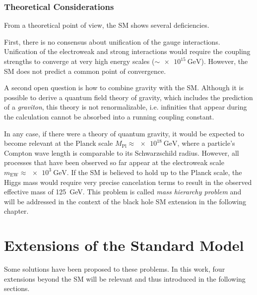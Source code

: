 \subsubsection{Theoretical Considerations}
From a theoretical point of view, the \ac{SM} shows several deficiencies. 

First, there is no consensus about unification of the gauge interactions. Unification of the electroweak and strong interactions would require the coupling strengths to converge at very high energy scales ($\sim \SI{e15}{\GeV}$). However, the \acl{SM} does not predict a common point of convergence\cite{Amaldi:Comparisongrandunified}. 

A second open question is how to combine gravity with the \acl{SM}. Although it is possible to derive a quantum field theory of gravity, which includes the prediction of a \emph{graviton}, this theory is not renormalizable, i.e. infinities that appear during the calculation cannot be absorbed into a running coupling constant\cite{Donoghue:IntroductionEffectiveField}.

In any case, if there were a theory of quantum gravity, it would be expected to become relevant at the Planck scale $M_\text{Pl} \approx \SI{e18}{\GeV}$, where a particle's Compton wave length is comparable to its Schwarzschild radius. However, all processes that have been observed so far appear at the electroweak scale $m_\text{EW} \approx \SI{e3}{\GeV}$. If the \acl{SM} is believed to hold up to the Planck scale, the Higgs mass would require very precise cancelation terms to result in the observed effective mass of \SI{125}{\GeV}. This problem is called \emph{mass hierarchy problem}\cite{Amaldi:Comparisongrandunified} and will be addressed in the context of the black hole \ac{SM} extension in the following chapter.


\section{Extensions of the Standard Model}
\label{sec:sm_extensions}

Some solutions have been proposed to these problems. In this work, four extensions beyond the \acl{SM} will be relevant and thus introduced in the following sections.

